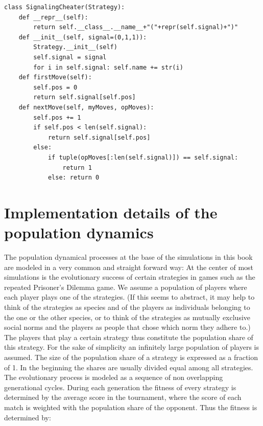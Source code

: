 \begin{scriptsize}
\begin{verbatim}
class SignalingCheater(Strategy):
    def __repr__(self):
        return self.__class__.__name__+"("+repr(self.signal)+")"
    def __init__(self, signal=(0,1,1)):
        Strategy.__init__(self)
        self.signal = signal
        for i in self.signal: self.name += str(i)
    def firstMove(self):
        self.pos = 0
        return self.signal[self.pos]
    def nextMove(self, myMoves, opMoves):
        self.pos += 1
        if self.pos < len(self.signal):
            return self.signal[self.pos]
        else:
            if tuple(opMoves[:len(self.signal)]) == self.signal:
                return 1
            else: return 0
\end{verbatim}
\end{scriptsize}


\newpage

\section{Implementation details of the population dynamics}
\label{implementationDetails}

The population dynamical processes at the base of the simulations in
this book are modeled in a very common and straight forward way: At
the center of most simulations is the evolutionary success of certain
strategies in games such as the repeated Prisoner's Dilemma game. We
assume a population of players where each player plays one of the
strategies. (If this seems to abstract, it may help to think of the
strategies as species and of the players as individuals belonging to
the one or the other species, or to think of the strategies as
mutually exclusive social norms and the players as people that chose
which norm they adhere to.) The players that play a certain strategy
thus constitute the population share of this strategy. For the sake of
simplicity an infinitely large population of players is assumed. The
size of the population share of a strategy is expressed as a fraction
of 1. In the beginning the shares are usually divided equal among all
strategies. The evolutionary process is modeled as a sequence of non
overlapping generational cycles. During each generation the fitness of
every strategy is determined by the average score in the tournament,
where the score of each match is weighted with the population share of
the opponent.  Thus the fitness is determined by:


